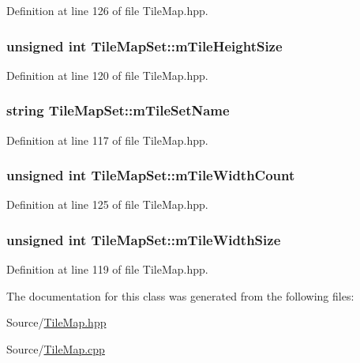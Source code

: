 Definition at line 126 of file Tile\-Map.\-hpp.

\hypertarget{class_tile_map_set_aa4620605087a8738afdfa4ef3e5fad99}{
\subsubsection[{m\-Tile\-Height\-Size}]{\setlength{\rightskip}{0pt plus 5cm}unsigned int Tile\-Map\-Set\-::m\-Tile\-Height\-Size\hspace{0.3cm}{\ttfamily [protected]}}}\label{class_tile_map_set_aa4620605087a8738afdfa4ef3e5fad99}


Definition at line 120 of file Tile\-Map.\-hpp.

\hypertarget{class_tile_map_set_a355b36e8f407752bd128b2a7d8babbba}{
\subsubsection[{m\-Tile\-Set\-Name}]{\setlength{\rightskip}{0pt plus 5cm}string Tile\-Map\-Set\-::m\-Tile\-Set\-Name\hspace{0.3cm}{\ttfamily [protected]}}}\label{class_tile_map_set_a355b36e8f407752bd128b2a7d8babbba}


Definition at line 117 of file Tile\-Map.\-hpp.

\hypertarget{class_tile_map_set_a53e0c59bfbd6285e0b0ca8f79a4af02c}{
\subsubsection[{m\-Tile\-Width\-Count}]{\setlength{\rightskip}{0pt plus 5cm}unsigned int Tile\-Map\-Set\-::m\-Tile\-Width\-Count\hspace{0.3cm}{\ttfamily [protected]}}}\label{class_tile_map_set_a53e0c59bfbd6285e0b0ca8f79a4af02c}


Definition at line 125 of file Tile\-Map.\-hpp.

\hypertarget{class_tile_map_set_ad1dee478b0dd00ff72a6635fd068b8cb}{
\subsubsection[{m\-Tile\-Width\-Size}]{\setlength{\rightskip}{0pt plus 5cm}unsigned int Tile\-Map\-Set\-::m\-Tile\-Width\-Size\hspace{0.3cm}{\ttfamily [protected]}}}\label{class_tile_map_set_ad1dee478b0dd00ff72a6635fd068b8cb}


Definition at line 119 of file Tile\-Map.\-hpp.



The documentation for this class was generated from the following files\-:\begin{DoxyCompactItemize}
\item 
Source/\hyperlink{_tile_map_8hpp}{Tile\-Map.\-hpp}\item 
Source/\hyperlink{_tile_map_8cpp}{Tile\-Map.\-cpp}\end{DoxyCompactItemize}
